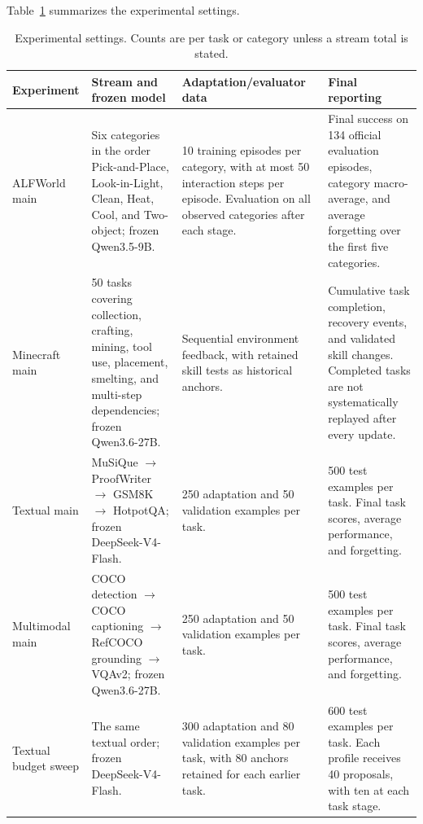 \documentclass{article}
\begin{document}
Table~\ref{tab:reproducibility_settings} summarizes the experimental settings.

\begin{table}[H]
\centering
\small
\caption{Experimental settings. Counts are per task or category unless a
stream total is stated.}
\label{tab:reproducibility_settings}
\setlength{\tabcolsep}{3pt}
\begin{tabular}{
p{}
p{}
p{}
p{}}
\toprule
Experiment & Stream and frozen model & Adaptation/evaluator data
& Final reporting \\
\midrule

ALFWorld main
& Six categories in the order Pick-and-Place, Look-in-Light, Clean, Heat,
Cool, and Two-object; frozen Qwen3.5-9B.
& 10 training episodes per category, with at most 50 interaction steps per
episode. Evaluation on all observed categories after each stage.
& Final success on 134 official evaluation episodes, category macro-average,
and average forgetting over the first five categories. \\

Minecraft main
& 50 tasks covering collection, crafting, mining, tool use, placement,
smelting, and multi-step dependencies; frozen Qwen3.6-27B.
& Sequential environment feedback, with retained skill tests as historical
anchors.
& Cumulative task completion, recovery events, and validated skill changes.
Completed tasks are not systematically replayed after every update. \\

Textual main
& MuSiQue $\rightarrow$ ProofWriter $\rightarrow$ GSM8K $\rightarrow$
HotpotQA; frozen DeepSeek-V4-Flash.
& 250 adaptation and 50 validation examples per task.
& 500 test examples per task. Final task scores, average performance, and
forgetting. \\

Multimodal main
& COCO detection $\rightarrow$ COCO captioning $\rightarrow$ RefCOCO
grounding $\rightarrow$ VQAv2; frozen Qwen3.6-27B.
& 250 adaptation and 50 validation examples per task.
& 500 test examples per task. Final task scores, average performance, and
forgetting. \\

Textual budget sweep
& The same textual order; frozen DeepSeek-V4-Flash.
& 300 adaptation and 80 validation examples per task, with 80 anchors retained
for each earlier task.
& 600 test examples per task. Each profile receives 40 proposals, with ten at
each task stage. \\
\bottomrule
\end{tabular}
\end{table}
\end{document}
